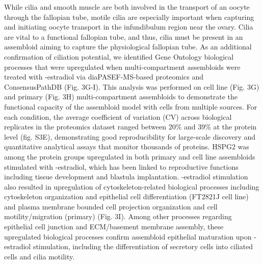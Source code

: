 \begin{refsection}
    While cilia and smooth muscle are both involved in the transport of an oocyte through the fallopian tube, motile cilia are especially important when capturing and initiating oocyte transport in the infundibulum region near the ovary\cite{yuan2021a,suarez2021a,wanggren2008a}. Cilia are vital to a functional fallopian tube, and thus, cilia must be present in an assembloid aiming to capture the physiological fallopian tube. As an additional confirmation of ciliation potential, we identified Gene Ontology\cite{ashburner2000a,Ashburner2000Gene} biological processes that were upregulated when multi-compartment assembloids were treated with \textbeta-estradiol via diaPASEF-MS-based proteomics\cite{meier2020a} and ConsensusPathDB\cite{kamburov2011a,kamburov2011a} (Fig. 3G-I). This analysis was performed on cell line (Fig. 3G) and primary (Fig. 3H) multi-compartment assembloids to demonstrate the functional capacity of the assembloid model with cells from multiple sources. For each condition, the average coefficient of variation (CV) across biological replicates in the proteomics dataset ranged between 20\% and 39\% at the protein level (fig. S3E), demonstrating good reproducibility for large-scale discovery and quantitative analytical assays that monitor thousands of proteins. HSPG2 was among the protein groups upregulated in both primary and cell line assembloids stimulated with \textbeta-estradiol, which has been linked to reproductive functions including tissue development and blastula implantation\cite{chen2023a,garcia2024a}.  \textbeta-estradiol stimulation also resulted in upregulation of cytoskeleton-related biological processes including cytoskeleton organization and epithelial cell differentiation (FT2821J cell line) and plasma membrane bounded cell projection organization and cell motility/migration (primary) (Fig. 3I). Among other processes regarding epithelial cell junction and ECM/basement membrane assembly, these upregulated biological processes confirm assembloid epithelial maturation upon \textbeta-estradiol stimulation, including the differentiation of secretory cells into ciliated cells and cilia motility\cite{park2008a,antoniades2014a,garcia2018a}.


\end{refsection}
